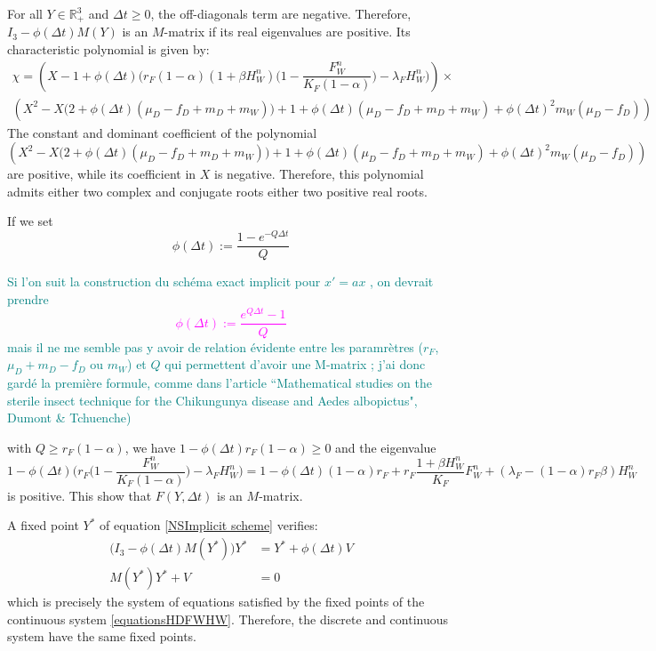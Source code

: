 \documentclass{article}
\newcommand{\lfw}{\lambda_{F}}
\newcommand{\lfw}{\lambda_{F}}
\newcommand{\marc}[1]{\textcolor{teal}{#1}}
\newcommand{\YD}[1]{\textcolor{magenta}{#1}}
\begin{document}
For all $Y \in \mathbb{R}^3_+$ and $\Delta t \geq 0$, the off-diagonals term are negative. Therefore, $I_3 - \phi(\Delta t) M(Y) $ is an $M$-matrix if its real eigenvalues are positive. Its characteristic polynomial is given by:
\begin{multline}
\chi = \left(X - 1 + \phi(\Delta t) \Big(r_F(1-\alpha)(1+\beta H_W^n)\Big(1 - \dfrac{F_W^n}{K_F(1 - \alpha)} \Big) - \lfw H_W^n \Big)\right) \times \\
\left(X^2 - X \Big(2 + \phi(\Delta t) (\mu_D - f_D + m_D + m_W) \Big) + 1 + \phi(\Delta t) (\mu_D - f_D + m_D + m_W) + \phi(\Delta t)^2 m_W ( \mu_D - f_D) \right)
\end{multline}
The constant and dominant coefficient of the polynomial $$\left(X^2 - X \Big(2 + \phi(\Delta t) (\mu_D - f_D + m_D + m_W) \Big) + 1 + \phi(\Delta t) (\mu_D - f_D + m_D + m_W) + \phi(\Delta t)^2 m_W ( \mu_D - f_D) \right)$$ are positive, while its coefficient in $X$ is negative. Therefore, this polynomial admits either two complex and conjugate roots either two positive real roots.

If we set
\begin{equation}
\phi(\Delta t) := \dfrac{1- e^{-Q \Delta t}}{Q}
\end{equation}

\marc{Si l'on suit la construction du schéma exact implicit pour $x' = a x$ , on devrait prendre
\YD{
\begin{equation}
\phi(\Delta t) := \dfrac{e^{Q \Delta t} - 1}{Q}
\end{equation}}
mais il ne me semble pas y avoir de relation évidente entre les paramrètres ($r_F$, $\mu_D+m_D-f_D$ ou $m_W$) et $Q$ qui permettent d'avoir une M-matrix ; j'ai donc gardé la première formule, comme dans l'article ``Mathematical studies on the sterile insect technique for the Chikungunya disease and Aedes albopictus", Dumont \& Tchuenche)
}

with $Q \geq r_F(1 - \alpha)$, we have $1 - \phi(\Delta t)r_F(1-\alpha) \geq 0$ and the eigenvalue $$1 - \phi(\Delta t) \Big(r_F\Big(1 - \dfrac{F_W^n}{K_F(1 - \alpha)} \Big) - \lfw H_W^n \Big) = 1 - \phi(\Delta t)(1-\alpha)r_F + r_F \dfrac{1 + \beta H_W^n}{K_F}F^n_W + (\lfw - (1-\alpha) r_F  \beta) H^n_W $$ is positive. This show that $F(Y, \Delta t)$ is an $M$-matrix.

\medskip
A fixed point $Y^*$ of equation \eqref{NSImplicit scheme} verifies:
\begin{align*}
\Big(I_3 - \phi(\Delta t) M(Y^*) \Big) Y^* &= Y^* + \phi(\Delta t)V \\
 M(Y^*) Y^* + V&= 0
\end{align*}
which is precisely the system of equations satisfied by the fixed points of the continuous system \eqref{equationsHDFWHW}. Therefore, the discrete and continuous system have the same fixed points.
\end{document}
